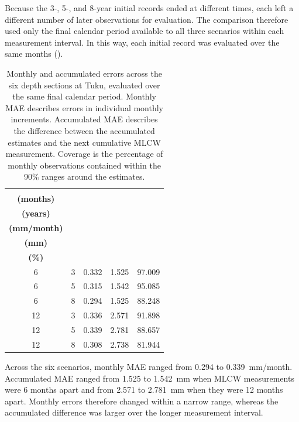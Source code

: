 Because the 3-, 5-, and 8-year initial records ended at different times, each left a different number of later observations for evaluation. The comparison therefore used only the final calendar period available to all three scenarios within each measurement interval. In this way, each initial record was evaluated over the same months ().

\begin{table}[H]
  \centering
  \small
  \setlength{\tabcolsep}{5pt}
  \renewcommand{\arraystretch}{1.2}
  \caption[Monthly and accumulated errors under reduced MLCW measurement frequency.]{Monthly and accumulated errors across the six depth sections at Tuku, evaluated over the same final calendar period. Monthly MAE describes errors in individual monthly increments. Accumulated MAE describes the difference between the accumulated estimates and the next cumulative MLCW measurement. Coverage is the percentage of monthly observations contained within the 90\% ranges around the estimates.}
  \label{tab:results_reduced_frequency}
  \begin{tabular}{ccrrr}
    \toprule
    \shortstack{\textbf{MLCW interval}\\\textbf{(months)}} & \shortstack{\textbf{Initial record}\\\textbf{(years)}} & \shortstack{\textbf{Monthly MAE}\\\textbf{(mm/month)}} & \shortstack{\textbf{Accumulated MAE}\\\textbf{(mm)}} & \shortstack{\textbf{Coverage}\\\textbf{(\%)}} \\
    \midrule
    6  & 3 & 0.332 & 1.525 & 97.009 \\
    6  & 5 & 0.315 & 1.542 & 95.085 \\
    6  & 8 & 0.294 & 1.525 & 88.248 \\
    12 & 3 & 0.336 & 2.571 & 91.898 \\
    12 & 5 & 0.339 & 2.781 & 88.657 \\
    12 & 8 & 0.308 & 2.738 & 81.944 \\
    \bottomrule
  \end{tabular}
\end{table}

Across the six scenarios, monthly MAE ranged from 0.294 to 0.339~mm/month. Accumulated MAE ranged from 1.525 to 1.542~mm when MLCW measurements were 6 months apart and from 2.571 to 2.781~mm when they were 12 months apart. Monthly errors therefore changed within a narrow range, whereas the accumulated difference was larger over the longer measurement interval.

